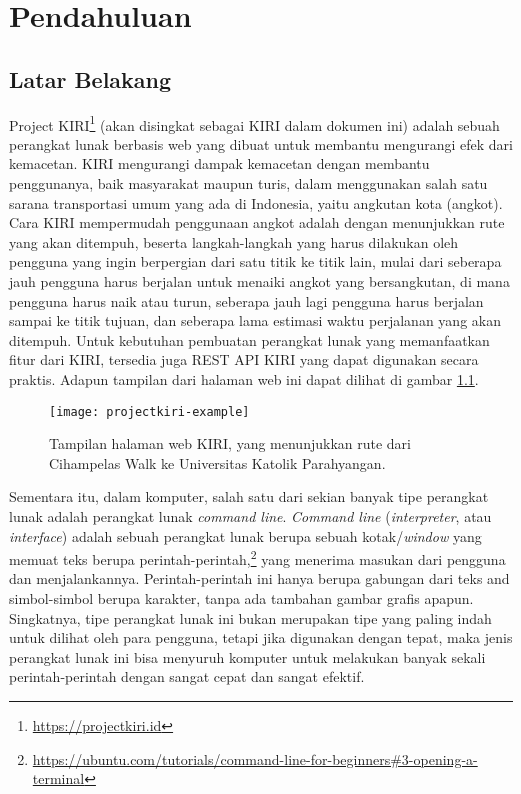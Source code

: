 \chapter{Pendahuluan}
\label{chap:intro}
   
\section{Latar Belakang}
\label{sec:label}
Project KIRI\footnote{\href{https://projectkiri.id}{https://projectkiri.id}} (akan disingkat sebagai KIRI dalam dokumen ini) adalah sebuah perangkat lunak berbasis web yang dibuat untuk \mbox{membantu} mengurangi efek dari kemacetan. KIRI mengurangi dampak kemacetan dengan membantu penggunanya, baik \mbox{masyarakat} maupun turis, dalam menggunakan salah satu sarana transportasi umum yang ada di Indonesia, yaitu angkutan kota (angkot). Cara KIRI \mbox{mempermudah} penggunaan angkot adalah dengan menunjukkan rute yang akan ditempuh, beserta langkah-langkah yang harus dilakukan oleh pengguna yang ingin berpergian dari satu titik ke titik lain, mulai dari seberapa jauh pengguna harus berjalan untuk menaiki angkot yang bersangkutan, di mana pengguna harus naik atau turun, seberapa jauh lagi pengguna harus berjalan sampai ke titik tujuan, dan seberapa lama estimasi waktu perjalanan yang akan ditempuh. Untuk kebutuhan pembuatan perangkat lunak yang memanfaatkan fitur dari KIRI, tersedia juga REST API KIRI yang dapat digunakan secara praktis. Adapun tampilan dari halaman web ini dapat dilihat di gambar \ref{fig:kiri-page}. 

\begin{figure}[ht]
    \centering
    \texttt{[image: projectkiri-example]}
    \caption[Tampilan halaman web KIRI]{Tampilan halaman web KIRI, yang menunjukkan rute dari Cihampelas Walk ke Universitas Katolik Parahyangan.}
    \label{fig:kiri-page}
\end{figure}

Sementara itu, dalam komputer, salah satu dari sekian banyak tipe perangkat lunak adalah perangkat lunak \textit{command line}. \textit{\mbox{Command} line} (\cl \textit{interpreter}, atau \cl \textit{interface}) adalah sebuah perangkat lunak berupa sebuah kotak/\textit{window} yang memuat teks berupa perintah-perintah,\footnote{\href{https://ubuntu.com/tutorials/command-line-for-beginners\#3-opening-a-terminal}{https://ubuntu.com/tutorials/command-line-for-beginners\#3-opening-a-terminal}} yang menerima masukan dari pengguna dan  menjalankannya.\cite{marsh:2010:fatfreeintrotocommandline} Perintah-perintah ini hanya berupa gabungan dari teks and simbol-simbol berupa karakter, tanpa ada tambahan gambar grafis apapun. Singkatnya, tipe perangkat lunak ini bukan merupakan tipe yang paling indah untuk dilihat oleh para pengguna, tetapi jika digunakan dengan tepat, maka \mbox{jenis} \mbox{perangkat} lunak ini bisa menyuruh komputer untuk melakukan banyak sekali perintah-perintah dengan sangat cepat dan sangat efektif.

